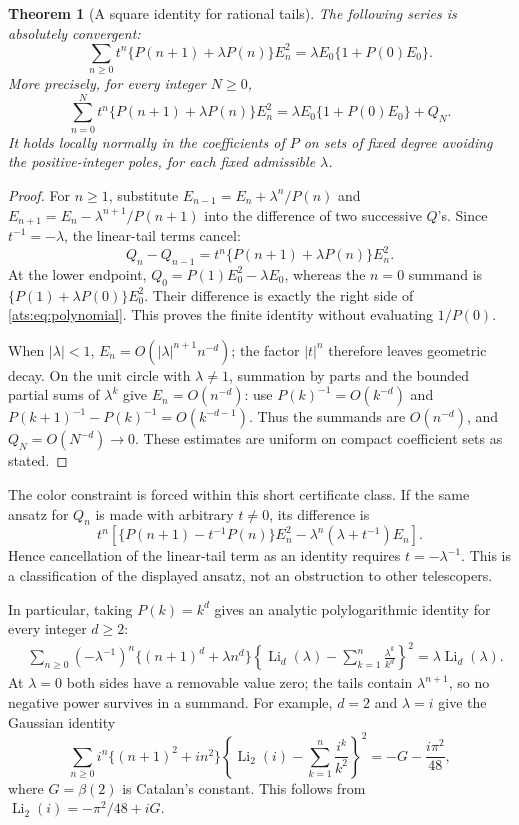 \documentclass[11pt,a4paper]{article}
\numberwithin{equation}{section}
\newtheorem{theorem}{Theorem}[section]
\theoremstyle{definition}
\theoremstyle{remark}
\begin{document}
\begin{theorem}[A square identity for rational tails]
\label{ats:thm:polynomial}
The following series is absolutely convergent:
\begin{equation}\label{ats:eq:polynomial}
 \sum_{n\ge0}t^n\{P(n+1)+\lambda P(n)\}E_n^2
 =\lambda E_0\{1+P(0)E_0\}.
\end{equation}
More precisely, for every integer $N\ge0$,
\begin{equation}\label{ats:eq:finite}
 \sum_{n=0}^{N}t^n\{P(n+1)+\lambda P(n)\}E_n^2
 =\lambda E_0\{1+P(0)E_0\}+Q_N.
\end{equation}
It holds locally normally in the coefficients of $P$ on sets of fixed
degree avoiding the positive-integer poles, for each fixed admissible
$\lambda$.
\end{theorem}

\begin{proof}
For $n\ge1$, substitute
$E_{n-1}=E_n+\lambda^n/P(n)$ and
$E_{n+1}=E_n-\lambda^{n+1}/P(n+1)$ into the difference of two
successive $Q$'s. Since $t^{-1}=-\lambda$, the linear-tail terms cancel:
\[
 Q_n-Q_{n-1}
 =t^n\{P(n+1)+\lambda P(n)\}E_n^2.
\]
At the lower endpoint,
$Q_0=P(1)E_0^2-\lambda E_0$, whereas the $n=0$ summand is
$\{P(1)+\lambda P(0)\}E_0^2$. Their difference is exactly the
right side of \eqref{ats:eq:polynomial}. This proves the finite identity
without evaluating $1/P(0)$.

When $|\lambda|<1$, $E_n=O(|\lambda|^{n+1}n^{-d})$; the factor
$|t|^n$ therefore leaves geometric decay. On the unit circle with
$\lambda\ne1$, summation by parts and the bounded partial sums of
$\lambda^k$ give $E_n=O(n^{-d})$: use
$P(k)^{-1}=O(k^{-d})$ and
$P(k+1)^{-1}-P(k)^{-1}=O(k^{-d-1})$.
Thus the summands are $O(n^{-d})$, and $Q_N=O(N^{-d})\to0$.
These estimates are uniform on compact coefficient sets as stated.
\end{proof}

The color constraint is forced within this short certificate class.
If the same ansatz for $Q_n$ is made with arbitrary $t\ne0$, its
difference is
\[
 t^n\left[\{P(n+1)-t^{-1}P(n)\}E_n^2
      -\lambda^n(\lambda+t^{-1})E_n\right].
\]
Hence cancellation of the linear-tail term as an identity requires
$t=-\lambda^{-1}$. This is a classification of the displayed ansatz,
not an obstruction to other telescopers.

In particular, taking $P(k)=k^d$ gives an analytic polylogarithmic
identity for every integer $d\ge2$:
\begin{align}\label{ats:eq:polylog-tail}
 &\sum_{n\ge0}(-\lambda^{-1})^n\{(n+1)^d+\lambda n^d\}
   \left\{\operatorname{Li}_d(\lambda)
               -\sum_{k=1}^{n}\frac{\lambda^k}{k^d}\right\}^{\!2}
 =\lambda\operatorname{Li}_d(\lambda).
\end{align}
At $\lambda=0$ both sides have a removable value zero; the tails
contain $\lambda^{n+1}$, so no negative power survives in a summand.
For example, $d=2$ and $\lambda=i$ give the Gaussian identity
\[
 \sum_{n\ge0}i^n\{(n+1)^2+in^2\}
 \left\{\operatorname{Li}_2(i)-\sum_{k=1}^{n}\frac{i^k}{k^2}\right\}^{\!2}
 =-G-\frac{i\pi^2}{48},
\]
where $G=\beta(2)$ is Catalan's constant. This follows from
$\operatorname{Li}_2(i)=-\pi^2/48+iG$.
\end{document}
